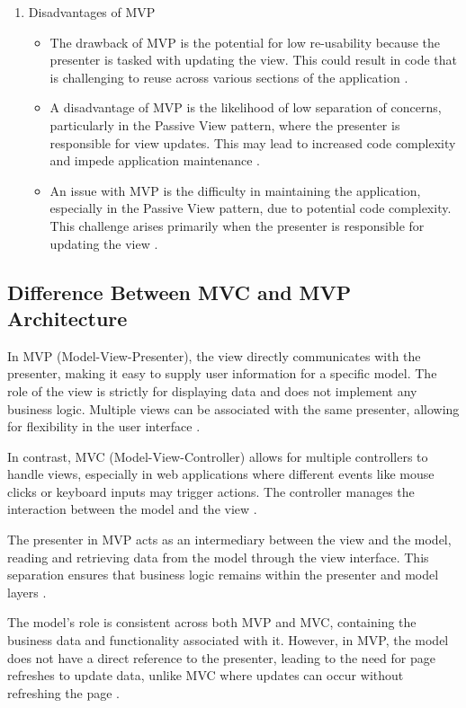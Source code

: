 \documentclass[conference]{IEEEtran}
\begin{document}
\begin{enumerate}
\begin{itemize}
\end{itemize}
\item Disadvantages of MVP
\begin{itemize}
\item The drawback of MVP is the potential for low re-usability because the presenter is tasked with updating the view. This could result in code that is challenging to reuse across various sections of the application \cite{Lappalainen2017APL}.
\item A disadvantage of MVP is the likelihood of low separation of concerns, particularly in the Passive View pattern, where the presenter is responsible for view updates. This may lead to increased code complexity and impede application maintenance \cite{Lappalainen2017APL}.
\item An issue with MVP is the difficulty in maintaining the application, especially in the Passive View pattern, due to potential code complexity. This challenge arises primarily when the presenter is responsible for updating the view \cite{Lappalainen2017APL}.
\end{itemize}
\end{enumerate}

\subsection{Difference Between MVC and MVP Architecture}
In MVP (Model-View-Presenter), the view directly communicates with the presenter, making it easy to supply user information for a specific model. The role of the view is strictly for displaying data and does not implement any business logic. Multiple views can be associated with the same presenter, allowing for flexibility in the user interface \cite{c2}.

In contrast, MVC (Model-View-Controller) allows for multiple controllers to handle views, especially in web applications where different events like mouse clicks or keyboard inputs may trigger actions. The controller manages the interaction between the model and the view \cite{c2}.

The presenter in MVP acts as an intermediary between the view and the model, reading and retrieving data from the model through the view interface. This separation ensures that business logic remains within the presenter and model layers \cite{c2}.

The model's role is consistent across both MVP and MVC, containing the business data and functionality associated with it. However, in MVP, the model does not have a direct reference to the presenter, leading to the need for page refreshes to update data, unlike MVC where updates can occur without refreshing the page \cite{c2}.




\end{document}
